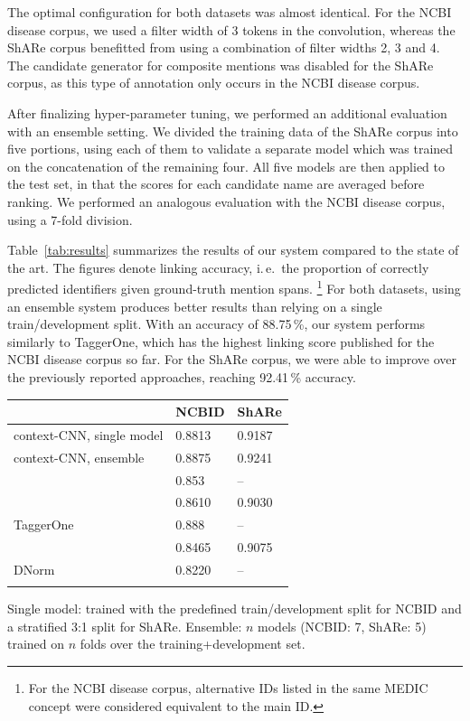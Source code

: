 \documentclass{bioinfo}
\newcommand{\ie}{i.\,e.\ }
\begin{document}
The optimal configuration for both datasets was almost identical.
For the NCBI disease corpus, we used a filter width of 3 tokens in the convolution, whereas the ShARe corpus benefitted from using a combination of filter widths 2, 3 and 4.
The candidate generator for composite mentions was disabled for the ShARe corpus, as this type of annotation only occurs in the NCBI disease corpus.

After finalizing hyper-parameter tuning, we performed an additional evaluation with an ensemble setting.
We divided the training data of the ShARe corpus into five portions, using each of them to validate a separate model which was trained on the concatenation of the remaining four.
All five models are then applied to the test set, in that the scores for each candidate name are averaged before ranking.
We performed an analogous evaluation with the NCBI disease corpus, using a 7-fold division.

Table~\ref{tab:results} summarizes the results of our system compared to the state of the art.
The figures denote linking accuracy, \ie the proportion of correctly predicted identifiers given ground-truth mention spans.%
\footnote{For the NCBI disease corpus, alternative IDs listed in the same MEDIC concept were considered equivalent to the main ID.}  %
For both datasets, using an ensemble system produces better results than relying on a single train/development split.
With an accuracy of 88.75\,\%, our system performs similarly to TaggerOne, which has the highest linking score published for the NCBI disease corpus so far.
For the ShARe corpus, we were able to improve over the previously reported approaches, reaching 92.41\,\% accuracy.

\begin{table}[!t]
{\begin{tabular}{@{}lll@{}}\toprule
                                   & NCBID  & ShARe \\\midrule
  context-CNN, single model        & 0.8813 & 0.9187 \\
  context-CNN, ensemble            & 0.8875 & 0.9241 \\
  \cite{liu-xu:2018:NLPCC}         & 0.853  & -- \\
  \cite{lihaodi-et-al:2017}        & 0.8610 & 0.9030 \\
  TaggerOne                        & 0.888  & -- \\
  \cite{dsouza-ng:2015:ACL-IJCNLP} & 0.8465 & 0.9075 \\
  DNorm                            & 0.8220 & -- \\\botrule
\end{tabular}}{Single model: trained with the predefined train/development split for NCBID and a stratified 3:1 split for ShARe. Ensemble: $n$ models (NCBID: 7, ShARe: 5) trained on $n$ folds over the training+development set.}
\end{table}
\end{document}
